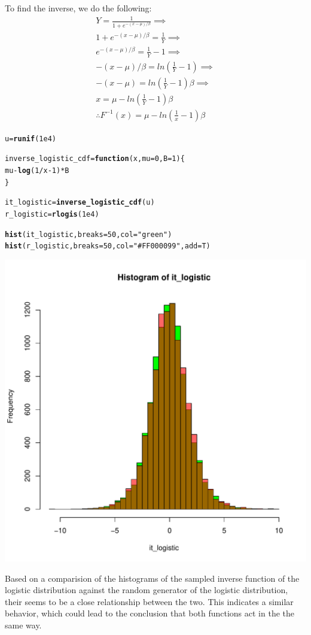 \documentclass{article}\usepackage[]{graphicx}\usepackage[]{color}
\makeatletter
\newcommand{\hlnum}[1]{\textcolor[rgb]{0.686,0.059,0.569}{#1}}%
\newcommand{\hlstr}[1]{\textcolor[rgb]{0.192,0.494,0.8}{#1}}%
\newcommand{\hlopt}[1]{\textcolor[rgb]{0,0,0}{#1}}%
\newcommand{\hlstd}[1]{\textcolor[rgb]{0.345,0.345,0.345}{#1}}%
\newcommand{\hlkwa}[1]{\textcolor[rgb]{0.161,0.373,0.58}{\textbf{#1}}}%
\newcommand{\hlkwb}[1]{\textcolor[rgb]{0.69,0.353,0.396}{#1}}%
\newcommand{\hlkwc}[1]{\textcolor[rgb]{0.333,0.667,0.333}{#1}}%
\newcommand{\hlkwd}[1]{\textcolor[rgb]{0.737,0.353,0.396}{\textbf{#1}}}%
\newenvironment{kframe}{%
 \def\at@end@of@kframe{}%
 \ifinner\ifhmode%
  \def\at@end@of@kframe{\end{minipage}}%
  \begin{minipage}{\columnwidth}%
 \fi\fi%
 \def\FrameCommand##1{\hskip\@totalleftmargin \hskip-\fboxsep
 \colorbox{shadecolor}{##1}\hskip-\fboxsep
     \hskip-\linewidth \hskip-\@totalleftmargin \hskip\columnwidth}%
 \MakeFramed {\advance\hsize-\width
   \@totalleftmargin\z@ \linewidth\hsize
   \@setminipage}}%
 {\par\unskip\endMakeFramed%
 \at@end@of@kframe}
\newenvironment{knitrout}{}{} %
\makeatother
\begin{document}
To find the inverse, we do the following:
\begin{equation}
\begin{split}
Y = \frac{1}{1+e^{-(x-\mu)/\beta}} \implies\\
1+e^{-(x-\mu)/\beta} = \frac{1}{Y} \implies\\
e^{-(x-\mu)/\beta} = \frac{1}{Y} - 1 \implies\\
-(x-\mu)/\beta = ln(\frac{1}{Y} - 1) \implies\\
-(x-\mu) = ln(\frac{1}{Y} - 1)\beta \implies\\
x = \mu - ln(\frac{1}{Y} - 1)\beta \\
\therefore F^{-1}(x) = \mu - ln(\frac{1}{x} - 1)\beta
\end{split}
\end{equation}
\begin{knitrout}
\color{fgcolor}\begin{kframe}
\begin{alltt}
\hlstd{u} \hlkwb{=} \hlkwd{runif}\hlstd{(}\hlnum{1e4}\hlstd{)}

\hlstd{inverse_logistic_cdf} \hlkwb{=} \hlkwa{function}\hlstd{(}\hlkwc{x}\hlstd{,} \hlkwc{mu} \hlstd{=} \hlnum{0} \hlstd{,} \hlkwc{B} \hlstd{=} \hlnum{1}\hlstd{)\{}
  \hlstd{mu} \hlopt{-} \hlkwd{log}\hlstd{(}\hlnum{1}\hlopt{/}\hlstd{x}\hlopt{-}\hlnum{1}\hlstd{)}\hlopt{*}\hlstd{B}
\hlstd{\}}

\hlstd{it_logistic} \hlkwb{=} \hlkwd{inverse_logistic_cdf}\hlstd{(u)}
\hlstd{r_logistic} \hlkwb{=} \hlkwd{rlogis}\hlstd{(}\hlnum{1e4}\hlstd{)}

\hlkwd{hist}\hlstd{(it_logistic,} \hlkwc{breaks} \hlstd{=} \hlnum{50}\hlstd{,} \hlkwc{col} \hlstd{=} \hlstr{"green"}\hlstd{)}
\hlkwd{hist}\hlstd{(r_logistic,} \hlkwc{breaks} \hlstd{=} \hlnum{50}\hlstd{,} \hlkwc{col} \hlstd{=} \hlstr{"#FF000099"}\hlstd{,} \hlkwc{add} \hlstd{= T)}
\end{alltt}
\end{kframe}
\includegraphics[width=0.50\linewidth]{figure/unnamed-chunk-2-1} 

\end{knitrout}
Based on a comparision of the histograms of the sampled inverse function of the logistic distribution against the random generator of the logistic distribution, their seems to be a close relationship between the two. This indicates a similar behavior, which could lead to the conclusion that both functions act in the the same way. 
\end{document}
